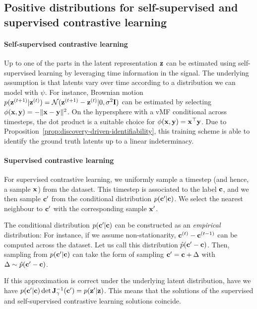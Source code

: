 \subsection{Positive distributions for self-supervised and supervised contrastive learning}\label{app:positive-distributions}

    \paragraph{Self-supervised contrastive learning}

        Up to one of the parts in the latent representation $\mathbf{z}$ can be estimated using self-supervised learning by leveraging time information in the signal. The underlying assumption is that latents vary over time according to a distribution we can model with $\psi$.
        For instance, Brownian motion $p(\mathbf{z}^{(t+1)} | \mathbf{z}^{(t)}) = \mathcal{N}(\mathbf{z}^{(t+1)} - \mathbf{z}^{(t)} | 0, \sigma^2 \mathbf{I})$ can be estimated by selecting $\phi(\mathbf{x}, \mathbf{y}) = -\|\mathbf{x} - \mathbf{y} \|^2$. On the hypersphere with a vMF conditional across timesteps, the dot product is a suitable choice for $\phi(\mathbf{x}, \mathbf{y}) = \mathbf{x}^\top \mathbf{y}$. 
        Due to Proposition~\ref{prop:discovery-driven-identifiability}, this training scheme is able to identify the ground truth latents up to a linear indeterminacy.

    
    \paragraph{Supervised contrastive learning}

        For supervised contrastive learning, we uniformly sample a timestep (and hence, a sample $\mathbf{x}$) from the dataset. This timestep is associated to the label $\mathbf{c}$, and we then sample $\mathbf{c}'$ from the conditional distribution $p(\mathbf{c}' | \mathbf{c})$. We select the nearest neighbour to $\mathbf{c}'$ with the corresponding sample $\mathbf{x}'$.

        The conditional distribution $p(\mathbf{c}' | \mathbf{c})$ can be constructed as an \emph{empirical} distribution: For instance, if we assume non-stationarity, $\mathbf{c}^{(t)} - \mathbf{c}^{(t-1)}$ can be computed across the dataset. Let us call this distribution $\hat{p}(\mathbf{c}' - \mathbf{c})$. Then, sampling from $p(\mathbf{c}' | \mathbf{c})$ can take the form of sampling $\mathbf{c}' = \mathbf{c} + \Delta$ with $\Delta \sim \hat{p}(\mathbf{c}' - \mathbf{c})$.

        If this approximation is correct under the underlying latent distribution, have we have $p(\mathbf{c}' | \mathbf{c}) \det \mathbf{J}_\gamma^{-1}(\mathbf{c}') = p(\mathbf{z}' | \mathbf{z})$. This means that the solutions of the supervised and self-supervised contrastive learning solutions coincide.

